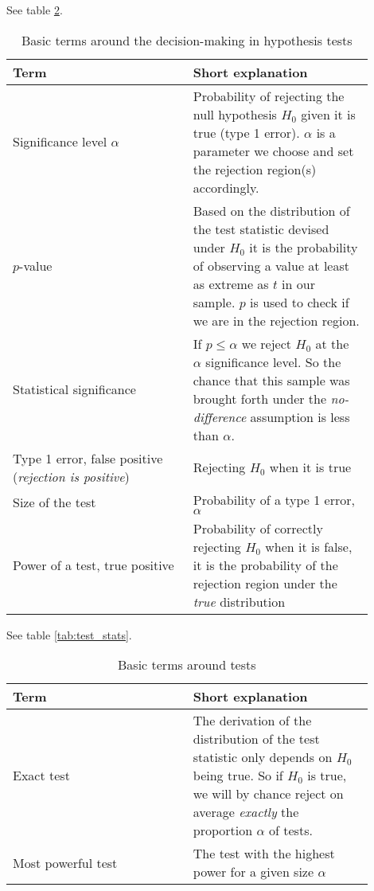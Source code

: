 See table \ref{tab:dec_mak}.
\begin{table}
    \centering
    \begin{tabular}{|p{0.45\linewidth}|p{0.45\linewidth}|}
        \hline \textcolor{blue1}{Term} & \textcolor{blue1}{Short explanation} \\
        \hline
        Significance level $\alpha$ & Probability of rejecting the null hypothesis $H_0$ given it is true (type 1 error). $\alpha$ is a
        parameter we choose and set the rejection region(s) accordingly. \\
        $p$-value & Based on the distribution of the test statistic devised under $H_0$ it is the probability of observing a value
        at least as extreme as $t$ in our sample. $p$ is used to check if we are in the rejection region. \\
        \hline
        Statistical significance & If $p\leq \alpha$ we reject $H_0$ at the $\alpha$ significance level. So the chance
        that this sample was brought forth under the \textit{no-difference} assumption is less than $\alpha$.\\
        \hline
        Type 1 error, false positive (\textit{rejection is positive}) & Rejecting $H_0$ when it is true \\
        \hline
        Size of the test & Probability of a type 1 error, $\alpha$ \\
        \hline
        Power of a test, true positive & Probability of correctly rejecting $H_0$ when it is false, it is
        the probability of the rejection region under the \textit{true} distribution \\
        \hline
    \end{tabular}
    \caption{Basic terms around the decision-making in hypothesis tests}
    \label{tab:dec_mak}
\end{table}

See table \ref{tab:test_stats}.
\begin{table}
    \centering
    \begin{tabular}{|p{0.45\linewidth}|p{0.45\linewidth}|}
        \hline \textcolor{blue1}{Term} & \textcolor{blue1}{Short explanation} \\
        \hline
        Exact test & The derivation of the distribution of the test statistic only depends on $H_0$ being
        true. So if $H_0$ is true, we will by chance reject on average \textit{exactly} the proportion $\alpha$ of tests. \\
        \hline
        Most powerful test & The test with the highest power for a given size $\alpha$ \\
        \hline
    \end{tabular}
    \caption{Basic terms around tests}
    \label{tab:dec_mak}
\end{table}

